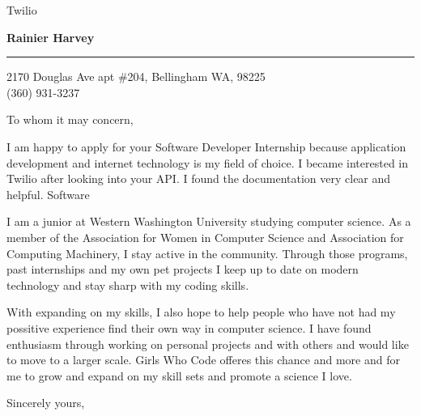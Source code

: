 \documentclass{letter} %
\begin{document}
\signature{%
Rainier Harvey}           %
\longindentation=0pt                       %
\let\raggedleft\raggedright                %


\begin{letter}{Twilio \\}


\begin{flushleft}
{\large\bf Rainier Harvey}
\end{flushleft}
\medskip\hrule height 1pt
\begin{flushright}
\hfill 2170 Douglas Ave apt \#204, Bellingham WA, 98225\\
\hfill (360) 931-3237
\end{flushright}
\vfill %


\opening{To whom it may concern,}

\noindent I am happy to apply for your Software Developer Internship because application development and internet technology is my field of choice.
I became interested in Twilio after looking into your API. I found the documentation very clear and helpful. Software

\noindent I am a junior at Western Washington University studying computer science. As a member of the Association for Women in Computer Science and Association for Computing Machinery,
I stay active in the community. Through those programs, past internships and my own pet projects I keep up to date on modern technology and stay sharp with my coding skills.


\noindent With expanding on my skills, I also hope to help people who have not had my possitive experience find their own way in computer science.
I have found enthusiasm through working on personal projects and with others and would like to
move to a larger scale. Girls Who Code offeres this chance and more and for me to grow and expand on my skill sets and promote a science I love.

\closing{Sincerely yours,}


\end{letter}
\end{document}
